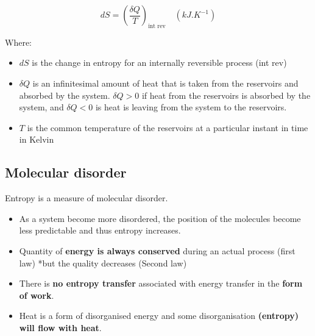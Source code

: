 \documentclass[11pt]{article}
\begin{document}
\[dS = \left(\frac{\delta Q}{T} \right)_{\text{int rev}} \quad \left(\unit{kJ.K^{-1}}\right)\]

Where:
\begin{itemize}
\item \(dS\) is the change in entropy for an internally reversible process (int rev)
\item \(\delta Q\) is an infinitesimal amount of heat that is taken from the reservoirs and absorbed by the system. \(\delta Q > 0\) if heat from the reservoirs is absorbed by the system, and \(\delta Q < 0\) is heat is leaving from the system to the reservoirs.
\item \(T\) is the common temperature of the reservoirs at a particular instant in time in Kelvin
\end{itemize}

\subsection{Molecular disorder}
\label{sec:org7262153}
Entropy is a measure of molecular disorder.
\begin{itemize}
\item As a system become more disordered, the position of the molecules become less predictable and thus entropy increases.
\item Quantity of \textbf{energy is always conserved} during an actual process (first law) *but the quality decreases (Second law)
\item There is \textbf{no entropy transfer} associated with energy transfer in the \textbf{form of work}.
\item Heat is a form of disorganised energy and some disorganisation \textbf{(entropy) will flow with heat}.
\end{itemize}
\end{document}
